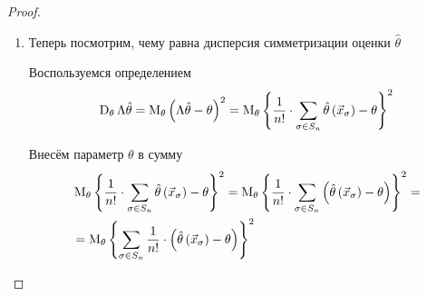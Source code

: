 \begin{proof}
\begin{enumerate}
\begin{comment}
      Не забываем, что математическое ожидание
      $\hat{\theta}\left( \vec{x}_{\sigma} \right)$ равно параметру
      $\theta$

      \begin{align*}
          \frac{1}{n!}\cdot \sum_{\sigma\in S_n}
        \meanof{\theta}{\hat{\theta}\left(\vec{x}_\sigma\right)}
        = \frac{1}{n!}\cdot \sum_{\sigma\in S_n}\theta
      \end{align*}

      Сумма имеет $n!$ слагаемых (количество перестановок $\sigma\in S_n$)
      \begin{align*}
          \frac{1}{n!}\cdot \sum_{\sigma\in S_n}\theta
        = \frac{1}{n!}\cdot n!\cdot \theta
        = \theta
      \end{align*}

      А это значит, что первый пункт доказан и симметризация
      несмещённой оценки $\hat{\theta}$ действительно несмещённая
      $$\meanof{\theta}{\Lambda\hat{\theta}}= \theta$$
      \end{comment}
    \item
      Теперь посмотрим, чему равна дисперсия симметризации
      оценки $\hat{\theta}$

      Воспользуемся определением
      \begin{align*}
          \operatorname{D}_{\theta} \Lambda\hat{\theta}
        = \operatorname{M}_{\theta} 
            \left(\Lambda\hat{\theta}-\theta\right)^2
        = \operatorname{M}_{\theta} 
            \left\{\frac{1}{n!}\cdot \sum_{\sigma\in S_n}
        \hat{\theta}\left(\vec{x}_\sigma\right)
        -\theta\right\}^2
      \end{align*}

      Внесём параметр $\theta$ в сумму
      \begin{align*}
        &\operatorname{M}_{\theta} \left\{ \frac{1}{n!} \cdot \sum_{\sigma\in S_n}
          \hat{\theta}\left( \vec{x}_\sigma \right) - \theta \right\}^2
        = \operatorname{M}_{\theta} 
          \left\{ \frac{1}{n!}\cdot \sum_{\sigma\in S_n}
          \left( \hat{\theta}\left( \vec{x}_\sigma \right)
            - \theta \right) \right\}^2 = \\
        &= \operatorname{M}_{\theta} 
          \left\{ \sum_{\sigma\in S_n}\frac{1}{n!}
            \cdot \left( \hat{\theta}\left(\vec{x}_\sigma \right)
              -\theta \right) \right\}^2
      \end{align*}


\end{enumerate}
\end{proof}
